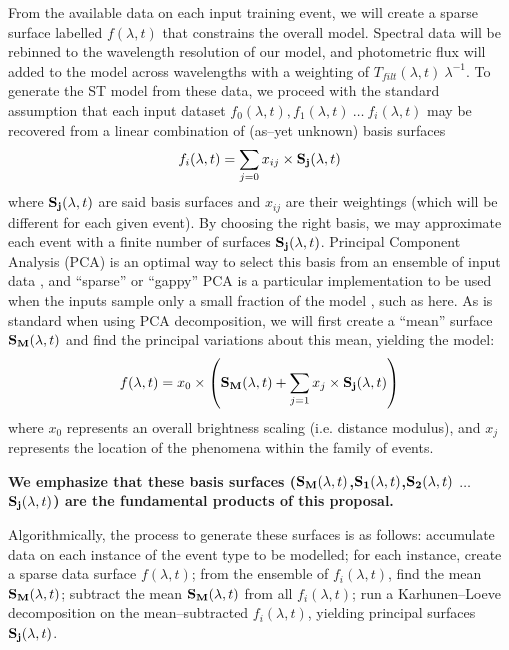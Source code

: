 From the available data on each input training event, we will create a sparse
surface labelled $f(\lambda, t)$ that constrains the overall model.  Spectral
data will be rebinned to the wavelength resolution of our model, and photometric
flux will added to the model across wavelengths with a weighting of
$T_{filt}(\lambda, t)~\lambda^{-1}$.  To generate the ST model from these data,
we proceed with the standard assumption that each input dataset $f_0(\lambda,
t), f_1(\lambda, t)~\ldots~f_i(\lambda, t)$ may be recovered from a linear
combination of (as--yet unknown) basis surfaces $$f_i(\lambda, t) = \sum_{j=0}
x_{ij} \times {\bf S_j}(\lambda, t)$$ where ${\bf S_j}(\lambda, t)$ are said
basis surfaces and $x_{ij}$ are their weightings (which will be different for
each given event).  By choosing the right basis, we may approximate each event
with a finite number of surfaces ${\bf S_j}(\lambda, t)$. Principal Component
Analysis (PCA) is an optimal way to select this basis from an ensemble of input
data \cite[e.g.][for astrophysical application to galaxy
spectra]{1995AJ....110.1071C}, and ``sparse'' or ``gappy'' PCA is a particular
implementation to be used when the inputs sample only a small fraction of the
model \citep[e.g.][]{zouht04}, such as here.  As is standard when using PCA
decomposition, we will first create a ``mean'' surface ${\bf S_M}(\lambda, t)$
and find the principal variations about this mean, yielding the model:
$$f(\lambda, t) = x_0 \times \left( {\bf S_M}(\lambda, t) + \sum_{j=1} x_j
\times {\bf S_j}(\lambda, t) \right)$$ where $x_0$ represents an overall
brightness scaling (i.e. distance modulus), and $x_j$ represents the location of
the phenomena within the family of events.

\begin{center} {\bf We emphasize that these basis surfaces (${\bf S_M}(\lambda,
t)$,${\bf S_1}(\lambda, t)$,${\bf S_2}(\lambda, t)$ $\ldots$ ${\bf S_j}(\lambda,
t)$) are the fundamental products of this proposal.} \end{center}

Algorithmically, the process to generate these surfaces is as follows:
accumulate data on each instance of the event type to be modelled; for each
instance, create a sparse data surface $f(\lambda, t)$; from the ensemble of
$f_i(\lambda, t)$, find the mean ${\bf S_M}(\lambda, t)$; subtract the mean
${\bf S_M}(\lambda, t)$ from all $f_i(\lambda, t)$; run a Karhunen--Loeve
decomposition \citep{Karhunen:47,Loeve:48} on the mean--subtracted $f_i(\lambda,
t)$, yielding principal surfaces ${\bf S_j}(\lambda, t)$.

